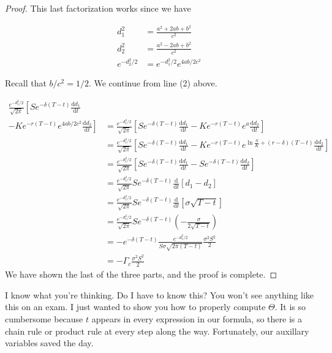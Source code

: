 \documentclass{ximera}
\begin{document}
\begin{proof}
This last factorization works since we have

	\begin{align*}
	d_1^2 		&=\frac{a^2+2ab+b^2}{c^2}\\
	d_2^2 		&=\frac{a^2-2ab+b^2}{c^2}\\
	e^{-d_2^2/2}	&=e^{-d_1^2/2}e^{4ab/2c^2}
	\end{align*}

Recall that $b/c^2=1/2$. We continue from line (2) above.

	\begin{align*}
	\frac{e^{-d_1^2/2}}{\sqrt{2\pi}}\left[Se^{-\delta(T-t)}\frac{\mathrm{d}d_1}{\mathrm{d}t}\right. 	&\\
	\left.-Ke^{-r(T-t)}e^{4ab/2c^2}\frac{\mathrm{d}d_2}{\mathrm{d}t}\right] 					&=\frac{e^{-d_1^2/2}}{\sqrt{2\pi}}\left[Se^{-\delta(T-t)}\frac{\mathrm{d}d_1}{\mathrm{d}t}-Ke^{-r(T-t)}e^{a}\frac{\mathrm{d}d_2}{\mathrm{d}t}\right]\\
																	&=\frac{e^{-d_1^2/2}}{\sqrt{2\pi}}\left[Se^{-\delta(T-t)}\frac{\mathrm{d}d_1}{\mathrm{d}t}-Ke^{-r(T-t)}e^{\ln\frac{S}{K}+(r-\delta)(T-t)}\frac{\mathrm{d}d_2}{\mathrm{d}t}\right]\\
																	&=\frac{e^{-d_1^2/2}}{\sqrt{2\pi}}\left[Se^{-\delta(T-t)}\frac{\mathrm{d}d_1}{\mathrm{d}t}-Se^{-\delta(T-t)}\frac{\mathrm{d}d_2}{\mathrm{d}t}\right]\\
																	&=\frac{e^{-d_1^2/2}}{\sqrt{2\pi}}Se^{-\delta(T-t)}\frac{\mathrm{d}}{\mathrm{d}t}\left[d_1-d_2\right]\\
																	&=\frac{e^{-d_1^2/2}}{\sqrt{2\pi}}Se^{-\delta(T-t)}\frac{\mathrm{d}}{\mathrm{d}t}[\sigma\sqrt{T-t}]\\
																	&=\frac{e^{-d_1^2/2}}{\sqrt{2\pi}}Se^{-\delta(T-t)}\left(-\frac{\sigma}{2\sqrt{T-t}}\right)\\
																	&=-e^{-\delta(T-t)}\frac{e^{-d_1^2/2}}{S\sigma\sqrt{2\pi(T-t)}}\frac{\sigma^2S^2}{2}\\
																	&=-\Gamma_c\frac{\sigma^2S^2}{2}
	\end{align*}
We have shown the last of the three parts, and the proof is complete.
\end{proof}

I know what you're thinking. Do I have to know this? You won't see anything like this on an exam. I just wanted to show you how to properly compute $\Theta$. It is so cumbersome because $t$ appears in every expression in our formula, so there is a chain rule or product rule at every step along the way. Fortunately, our auxillary variables saved the day. 
\end{document}
